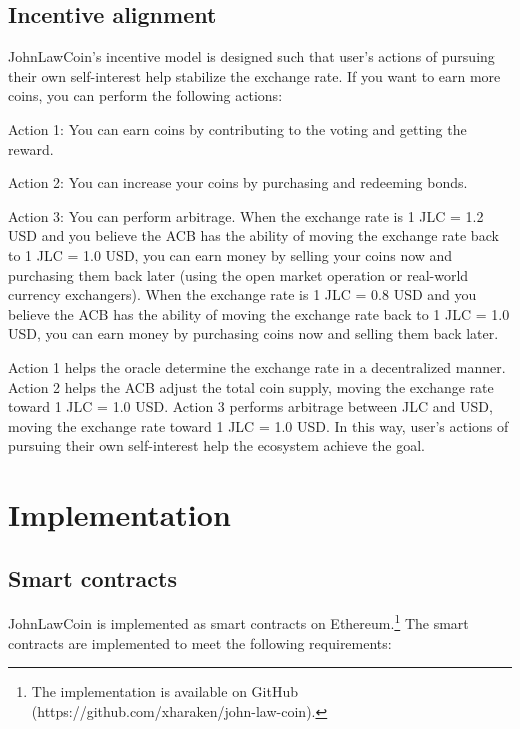 \documentclass[dvipdfmx,a4paper]{article}
\begin{document}
\subsection{Incentive alignment}

JohnLawCoin's incentive model is designed such that user's actions of pursuing their own self-interest help stabilize the exchange rate. If you want to earn more coins, you can perform the following actions:

\begin{description}
\item{Action 1}: You can earn coins by contributing to the voting and getting the reward.
\item{Action 2}: You can increase your coins by purchasing and redeeming bonds.
\item{Action 3}: You can perform arbitrage. When the exchange rate is 1 JLC = 1.2 USD and you believe the ACB has the ability of moving the exchange rate back to 1 JLC = 1.0 USD, you can earn money by selling your coins now and purchasing them back later (using the open market operation or real-world currency exchangers). When the exchange rate is 1 JLC = 0.8 USD and you believe the ACB has the ability of moving the exchange rate back to 1 JLC = 1.0 USD, you can earn money by purchasing coins now and selling them back later.
\end{description}

Action 1 helps the oracle determine the exchange rate in a decentralized manner. Action 2 helps the ACB adjust the total coin supply, moving the exchange rate toward 1 JLC = 1.0 USD. Action 3 performs arbitrage between JLC and USD, moving the exchange rate toward 1 JLC = 1.0 USD. In this way, user's actions of pursuing their own self-interest help the ecosystem achieve the goal.

\section{Implementation}

\subsection{Smart contracts}

JohnLawCoin is implemented as smart contracts on Ethereum.\footnote{The implementation is available on GitHub (https://github.com/xharaken/john-law-coin).} The smart contracts are implemented to meet the following requirements:
\end{document}
